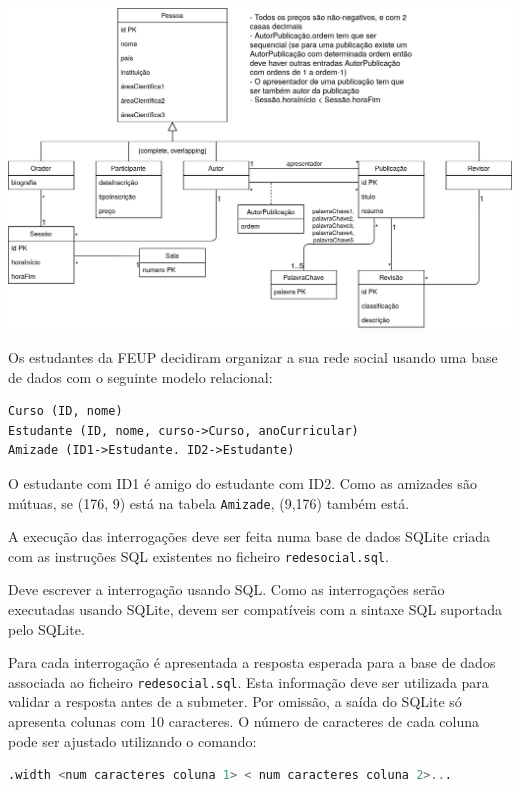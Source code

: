 \documentclass[type=recurso, year=2015/16]{bdad_exam}
\begin{document}
{\begin{center}
    \includegraphics[scale=0.246]{2016R_13.png}
\end{center}

\newpage
{}
Os estudantes da FEUP decidiram organizar a sua rede social usando uma base de dados com o seguinte modelo relacional:

\begin{lstlisting}[numbers=none]
Curso (ID, nome)
Estudante (ID, nome, curso->Curso, anoCurricular)
Amizade (ID1->Estudante. ID2->Estudante)
\end{lstlisting}

O estudante com ID1 é amigo do estudante com ID2. Como as amizades são mútuas, se (176, 9) está na tabela \texttt{Amizade}, (9,176) também está.

A execução das interrogações deve ser feita numa base de dados SQLite criada com as instruções SQL existentes no ficheiro \texttt{redesocial.sql}.

Deve escrever a interrogação usando SQL. Como as interrogações serão executadas usando SQLite, devem ser compatíveis com a sintaxe SQL suportada pelo SQLite.

Para cada interrogação é apresentada a resposta esperada para a base de dados associada ao ficheiro \texttt{redesocial.sql}. Esta informação deve ser utilizada para validar a resposta antes de a submeter. Por omissão, a saída do SQLite só apresenta colunas com 10 caracteres. O número de caracteres de cada coluna pode ser ajustado utilizando o comando:

\begin{lstlisting}[language=SQL,numbers=none]
.width <num caracteres coluna 1> < num caracteres coluna 2>...
\end{lstlisting}

}
\end{document}
